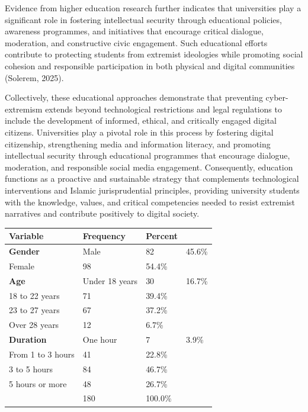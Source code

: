 \documentclass[11pt,a4paper]{article}
\begin{document}
	Evidence from higher education research further indicates that universities play a significant role in fostering intellectual security through educational policies, awareness programmes, and initiatives that encourage critical dialogue, moderation, and constructive civic engagement. Such educational efforts contribute to protecting students from extremist ideologies while promoting social cohesion and responsible participation in both physical and digital communities (Solerem, 2025).
	
	Collectively, these educational approaches demonstrate that preventing cyber-extremism extends beyond technological restrictions and legal regulations to include the development of informed, ethical, and critically engaged digital citizens. Universities play a pivotal role in this process by fostering digital citizenship, strengthening media and information literacy, and promoting intellectual security through educational programmes that encourage dialogue, moderation, and responsible social media engagement. Consequently, education functions as a proactive and sustainable strategy that complements technological interventions and Islamic jurisprudential principles, providing university students with the knowledge, values, and critical competencies needed to resist extremist narratives and contribute positively to digital society.
	
	\begin{table}[h]
		\centering
		\begin{tabular}{|l|l|l|l|}
			\hline
			Variable & Frequency & Percent &  \\ \hline
			\textbf{Gender} & Male & 82 & 45.6\% \\ \hline
			Female & 98 & 54.4\% &  \\ \hline
			\textbf{Age} & Under 18 years & 30 & 16.7\% \\ \hline
			18 to 22 years & 71 & 39.4\% &  \\ \hline
			23 to 27 years & 67 & 37.2\% &  \\ \hline
			Over 28 years & 12 & 6.7\% &  \\ \hline
			\textbf{Duration} & One hour & 7 & 3.9\% \\ \hline
			From 1 to 3 hours & 41 & 22.8\% &  \\ \hline
			3 to 5 hours & 84 & 46.7\% &  \\ \hline
			5 hours or more & 48 & 26.7\% &  \\ \hline
			& 180 & 100.0\% &  \\ \hline
		\end{tabular}
	\end{table}
	
\end{document}
